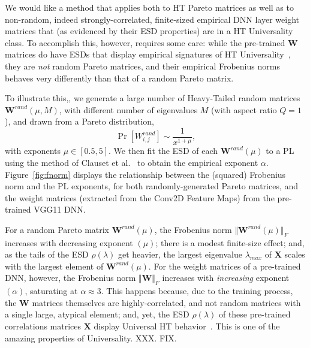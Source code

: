 We would like a method that applies both to HT Pareto matrices as well as to non-random, indeed strongly-correlated, finite-sized empirical DNN layer weight matrices that (as evidenced by their ESD properties) are in a HT Universality class.  
To accomplish this, however, requires some care: while the pre-trained $\mathbf{W}$ matrices do have ESDs that display empirical signatures of HT Universality~\cite{MM18_TR}, they are \emph{not} random Pareto matrices, and their empirical Frobenius norms behaves very differently than that of a random Pareto matrix.  

To illustrate this,, we generate a large number of  Heavy-Tailed  random matrices $\mathbf{W}^{rand}(\mu,M)$, with different number of eigenvalues $M$ (with aspect ratio $Q=1$), and drawn from a Pareto distribution,
$$
\Pr[{W}^{rand}_{i,j}]\sim\dfrac{1}{x^{1+\mu}}  ,
$$
with exponents $\mu\in[0.5, 5]$.
%
We then fit the ESD of each $\mathbf{W}^{rand}(\mu)$ to a PL using the method of Clauset et al.~\cite{CSN09_powerlaw,ABP14} to obtain the empirical exponent $\alpha$.   Figure~\ref{fig:fnorm} displays the relationship between the (squared) Frobenius norm and the PL exponents, for both randomly-generated Pareto matrices, and the weight matrices
(extracted from the Conv2D Feature Maps) from the pre-trained VGG11 DNN.

For a random Pareto matrix $\mathbf{W}^{rand}(\mu)$, the Frobenius norm $\Vert\mathbf{W}^{rand}(\mu)\Vert_{F}$ increases with decreasing exponent $(\mu)$; there is a modest finite-size effect; and, as the tails of the ESD $\rho(\lambda)$ get heavier, the largest eigenvalue $\lambda_{max}$ of $\mathbf{X}$ scales with the largest element of $\mathbf{W}^{rand}(\mu)$. 
For the weight matrices of a pre-trained DNN, however, the Frobenius norm $\Vert\mathbf{W}\Vert_{F}$ increases with \emph{increasing} exponent $(\alpha)$, saturating at $\alpha\approx 3$.
This happens because, due to the training process, the $\mathbf{W}$ matrices themselves are highly-correlated, and not random matrices with a single large, atypical element;   
and, yet, the ESD $\rho(\lambda)$ of these pre-trained correlations matrices $\mathbf{X}$ display Universal HT behavior~\cite{MM18_TR}.
This is one of the amazing properties of Universality.
XXX.  FIX.

 
 

